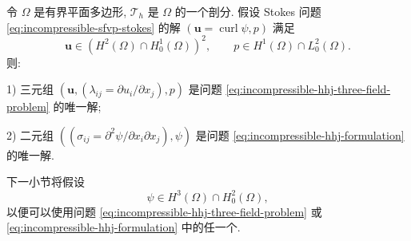 \begin{Theorem}\label{thm:incompressible-hhj-continuous-equivalence}
令 $\Omega$ 是有界平面多边形,
$\mathcal T_h$ 是 $\Omega$ 的一个剖分.
假设 Stokes 问题 \eqref{eq:incompressible-sfvp-stokes}
的解 $(\mathbf u=\operatorname{curl}\psi,p)$ 满足
\[
\mathbf u\in(H^2(\Omega)\cap H_0^1(\Omega))^2,
\qquad p\in H^1(\Omega)\cap L_0^2(\Omega).
\]
则:

\textup{1)} 三元组
$(\mathbf u,(\lambda_{ij}=\partial u_i/\partial x_j),p)$
是问题 \eqref{eq:incompressible-hhj-three-field-problem} 的唯一解;

\textup{2)} 二元组
$((\sigma_{ij}=\partial^2\psi/
\partial x_i\partial x_j),\psi)$
是问题 \eqref{eq:incompressible-hhj-formulation} 的唯一解.
\end{Theorem}

下一小节将假设
\begin{equation}\label{eq:incompressible-hhj-regularity-assumption}
\psi\in H^3(\Omega)\cap H_0^2(\Omega),
\end{equation}
以便可以使用问题
\eqref{eq:incompressible-hhj-three-field-problem}
或 \eqref{eq:incompressible-hhj-formulation} 中的任一个.
